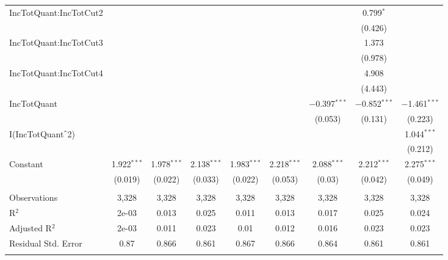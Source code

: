 \begin{table}[!htbp]
\begin{tabular}{@{\extracolsep{5pt}}lcccccccc}
  IncTotQuant:IncTotCut2 &  &  &  &  &  &  & 0.799$^{*}$ &  \\ 
  &  &  &  &  &  &  & (0.426) &  \\ 
  IncTotQuant:IncTotCut3 &  &  &  &  &  &  & 1.373 &  \\ 
  &  &  &  &  &  &  & (0.978) &  \\ 
  IncTotQuant:IncTotCut4 &  &  &  &  &  &  & 4.908 &  \\ 
  &  &  &  &  &  &  & (4.443) &  \\ 
  IncTotQuant &  &  &  &  &  & $-$0.397$^{***}$ & $-$0.852$^{***}$ & $-$1.461$^{***}$ \\ 
  &  &  &  &  &  & (0.053) & (0.131) & (0.223) \\ 
  I(IncTotQuant$\hat{\mkern6mu}$2) &  &  &  &  &  &  &  & 1.044$^{***}$ \\ 
  &  &  &  &  &  &  &  & (0.212) \\ 
  Constant & 1.922$^{***}$ & 1.978$^{***}$ & 2.138$^{***}$ & 1.983$^{***}$ & 2.218$^{***}$ & 2.088$^{***}$ & 2.212$^{***}$ & 2.275$^{***}$ \\ 
  & (0.019) & (0.022) & (0.033) & (0.022) & (0.053) & (0.03) & (0.042) & (0.049) \\ 
 \hline \\[-1.8ex] 
Observations & 3,328 & 3,328 & 3,328 & 3,328 & 3,328 & 3,328 & 3,328 & 3,328 \\ 
R$^{2}$ & 2e-03 & 0.013 & 0.025 & 0.011 & 0.013 & 0.017 & 0.025 & 0.024 \\ 
Adjusted R$^{2}$ & 2e-03 & 0.011 & 0.023 & 0.01 & 0.012 & 0.016 & 0.023 & 0.023 \\ 
Residual Std. Error & 0.87 & 0.866 & 0.861 & 0.867 & 0.866 & 0.864 & 0.861 & 0.861 \\ 
\hline 
\hline \\[-1.8ex] 
\end{tabular} 
\end{table} 
